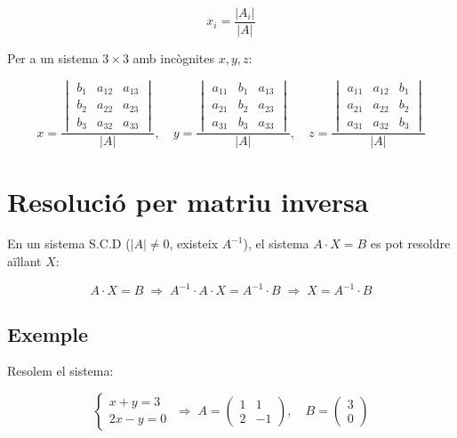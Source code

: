 \begin{equation*}
x_i = \frac{|A_i|}{|A|}
\end{equation*}

Per a un sistema $3\times 3$ amb incògnites $x, y, z$:

\begin{equation*}
x = \frac{\begin{vmatrix} b_1 & a_{12} & a_{13} \\ b_2 & a_{22} & a_{23} \\ b_3 & a_{32} & a_{33} \end{vmatrix}}{|A|},\quad y = \frac{\begin{vmatrix} a_{11} & b_1 & a_{13} \\ a_{21} & b_2 & a_{23} \\ a_{31} & b_3 & a_{33} \end{vmatrix}}{|A|},\quad z = \frac{\begin{vmatrix} a_{11} & a_{12} & b_1 \\ a_{21} & a_{22} & b_2 \\ a_{31} & a_{32} & b_3 \end{vmatrix}}{|A|}
\end{equation*}

\section{Resolució per matriu inversa}

En un sistema S.C.D ($|A| \neq 0$, existeix $A^{-1}$), el sistema $A\cdot X = B$ es pot resoldre aïllant $X$:

\begin{equation*}
A\cdot X = B \;\Longrightarrow\; A^{-1}\cdot A\cdot X = A^{-1}\cdot B \;\Longrightarrow\; X = A^{-1}\cdot B
\end{equation*}

\subsection{Exemple}

Resolem el sistema:

\begin{equation*}
\begin{cases} x + y = 3 \\ 2x - y = 0 \end{cases} \;\Rightarrow\; A = \begin{pmatrix} 1 & 1 \\ 2 & -1 \end{pmatrix},\quad B = \begin{pmatrix} 3 \\ 0 \end{pmatrix}
\end{equation*}


